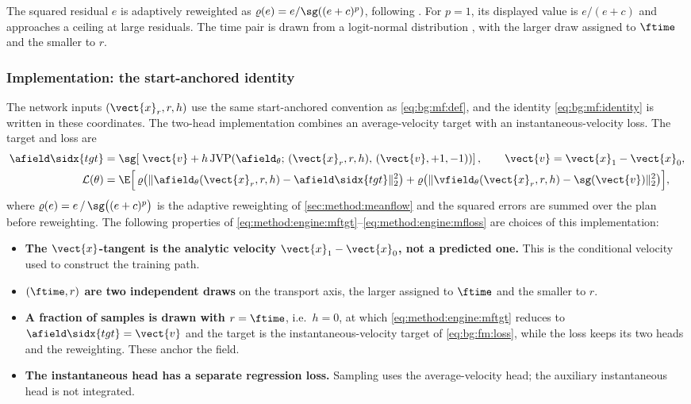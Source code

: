 The squared residual $e$ is adaptively reweighted as
$\varrho(e)=e/\sg((e+c)^{p})$, following \parencite[Sec.~4.3]{geng2025meanflow}.
For $p=1$, its displayed value is $e/(e+c)$ and approaches a ceiling at large residuals.
The time pair is drawn from a logit-normal distribution \parencite{esser2024scaling}, with the
larger draw assigned to $\ftime$ and the smaller to $r$.

\subsubsection*{Implementation: the start-anchored identity}

The network inputs $(\vect{x}_{r},r,h)$ use the same start-anchored convention as
\eqref{eq:bg:mf:def}, and the identity \eqref{eq:bg:mf:identity} is written in these coordinates.
The two-head implementation combines an average-velocity target with an instantaneous-velocity
loss. The target and loss are
\begin{align}
  \afield\sidx{tgt}
    &= \sg\!\left[\;\vect{v} + h\,
       \mathrm{JVP}\!\left(\afield_{\theta};\,
         (\vect{x}_{r},r,h),\,(\vect{v},+1,-1)\right)\right],
       \qquad \vect{v} = \vect{x}_{1}-\vect{x}_{0},
       \label{eq:method:engine:mftgt}\\
  \mathcal{L}(\theta)
    &= \E\Big[\,
        \varrho\big(\|\afield_{\theta}(\vect{x}_{r},r,h) - \afield\sidx{tgt}\|_{2}^{2}\big)
      + \varrho\big(\|\vfield_{\theta}(\vect{x}_{r},r,h) - \sg(\vect{v})\|_{2}^{2}\big)\Big],
       \label{eq:method:engine:mfloss}
\end{align}
where $\varrho(e) = e\,/\,\sg\big((e+c)^{p}\big)$ is the adaptive reweighting of
\autoref{sec:method:meanflow} and the squared errors are summed over the plan before reweighting.
The following properties of \eqref{eq:method:engine:mftgt}--\eqref{eq:method:engine:mfloss} are choices of
this implementation:

\begin{itemize}
  \item \textbf{The $\vect{x}$-tangent is the analytic velocity $\vect{x}_{1}-\vect{x}_{0}$, not a
    predicted one.} This is the conditional velocity used to construct the training path.
  \item \textbf{$(\ftime,r)$ are two independent draws} on the transport axis, the larger
    assigned to $\ftime$ and the smaller to $r$.
  \item \textbf{A fraction of samples is drawn with $r = \ftime$}, i.e.\ $h=0$, at which
    \eqref{eq:method:engine:mftgt} reduces to $\afield\sidx{tgt} = \vect{v}$ and the target
    is the instantaneous-velocity target of \eqref{eq:bg:fm:loss}, while the loss keeps its two heads and the
    reweighting. These anchor the field.
  \item \textbf{The instantaneous head has a separate regression loss.} Sampling uses the
    average-velocity head; the auxiliary instantaneous head is not integrated.
\end{itemize}


